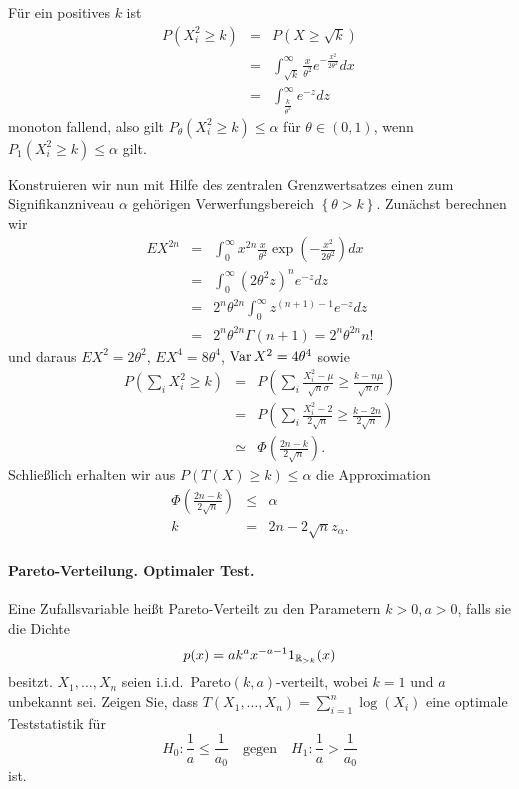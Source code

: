 Für ein positives $k$ ist 
\begin{eqnarray*}
    P \left( X_i^2 \geq k \right) &=& P \left( X \geq \sqrt{k}  \right) \\
    &=& \int_{\sqrt{k}}^{\infty} \frac{x}{\theta^2} e^{ - \frac{x^2}{ 2 \theta^2}} d x \\
    &=& \int_{\frac{k}{\theta^2}}^{\infty} e^{-z} dz
\end{eqnarray*}
monoton fallend, also gilt $P_\theta \left( X_i^2 \geq k \right) \leq \alpha$ für $\theta\in (0,1)$,
wenn $P_1 \left( X_i^2 \geq k \right)\leq \alpha$ gilt.

Konstruieren wir nun mit Hilfe des zentralen Grenzwertsatzes einen zum Signifikanzniveau 
$\alpha$ gehörigen Verwerfungsbereich $\left\{ \theta>k \right\}$. Zunächst berechnen wir
\begin{eqnarray*}
    E X^{2n} &=&  \int_{0}^{\infty} x^{2n} \frac{x}{\theta^2} \exp \left( - \frac{x^2}{2\theta^2} \right) dx \\
    &=&  \int_{0}^{\infty} \left( 2 \theta^2 z \right)^n e^{-z} dz \\
    &=& 2^n \theta^{2n} \int_{0}^{\infty} z^{(n+1)-1}e^{-z} dz  \\
    &=& 2^n \theta^{2n} \Gamma(n+1) = 2^n \theta^{2n} n!
\end{eqnarray*}
und daraus $E X^2 = 2 \theta^2$, $E X^4 = 8 \theta^4$, $\operatorname{Var} X^2 = 4 \theta^4$ sowie
\begin{eqnarray*}
    P \left( \sum_{i} X_i^2 \geq k \right)&=&  
    P \left( \sum_{i}^{} \frac{X_i^2 - \mu}{\sqrt{n} \sigma} \geq \frac{k -n \mu}{\sqrt{n} \sigma} \right) \\
    &=& P \left( \sum_{i}^{} \frac{X_i^2 - 2}{2\sqrt{n}} \geq \frac{k-2n}{2\sqrt{n}} \right) \\
    &\simeq & \Phi \left( \frac{2n -k}{2 \sqrt{n}} \right). 
\end{eqnarray*}
Schließlich erhalten wir aus $P \left( T(X) \geq k \right) \leq \alpha$ die Approximation
\begin{eqnarray*}
    \Phi\left( \frac{2n - k}{ 2\sqrt{n}}  \right) &\leq & \alpha \\
    k &=& 2n - 2 \sqrt{n} z_\alpha.
\end{eqnarray*}





\paragraph{Pareto-Verteilung. Optimaler Test.}  Eine Zufallsvariable heißt Pareto-Verteilt
zu den Parametern $k>0,a>0$, falls sie die Dichte 
\begin{equation*}
    p(x) = a k^a x^{-a-1} 1_{\mathbb R_{>k}}(x)
\end{equation*}
besitzt. $X_1,\ldots,X_n$ seien i.i.d.\ Pareto$(k,a)$-verteilt, wobei $k=1$ und $a$ unbekannt sei.
Zeigen Sie, dass $T(X_1,\ldots,X_n)= \sum_{i=1}^{n} \log\left( X_i \right)$ eine optimale 
Teststatistik für
\begin{equation*}
    H_0 : \frac{1}{a} \leq \frac{1}{a_0} \quad \textrm{gegen} \quad H_1 : \frac{1}{a} > \frac{1}{a_0}
\end{equation*}
ist.

